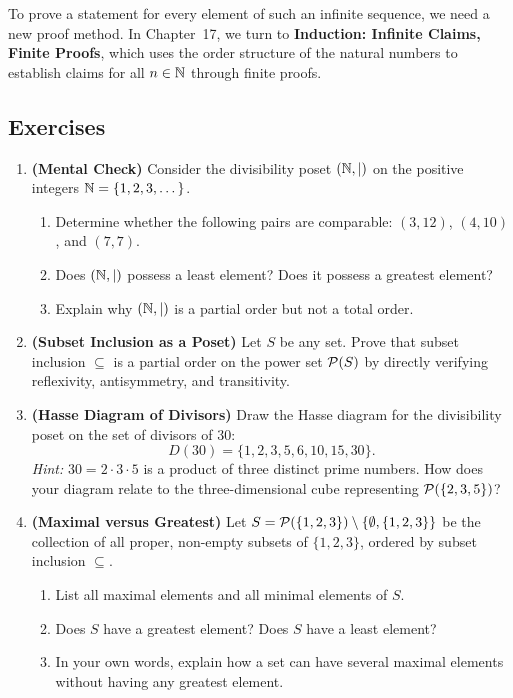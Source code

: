 To prove a statement for every element of such an infinite sequence, we need a new proof method. In Chapter~17, we turn to \textbf{Induction: Infinite Claims, Finite Proofs}, which uses the order structure of the natural numbers to establish claims for all $n \in \mathbb{N}$ through finite proofs.

\subsection{Exercises}

\begin{enumerate}
\item \textbf{(Mental Check)} Consider the divisibility poset $(\mathbb{N}, \mid)$ on the positive integers $\mathbb{N} = \{1, 2, 3, \dots\}$.
\begin{enumerate}[label=(\alph*)]
\item Determine whether the following pairs are comparable: $(3, 12)$, $(4, 10)$, and $(7, 7)$.
\item Does $(\mathbb{N}, \mid)$ possess a least element? Does it possess a greatest element?
\item Explain why $(\mathbb{N}, \mid)$ is a partial order but not a total order.
\end{enumerate}

\item \textbf{(Subset Inclusion as a Poset)} Let $S$ be any set. Prove that subset inclusion $\subseteq$ is a partial order on the power set $\mathcal{P}(S)$ by directly verifying reflexivity, antisymmetry, and transitivity.

\item \textbf{(Hasse Diagram of Divisors)} Draw the Hasse diagram for the divisibility poset on the set of divisors of $30$:
\[
D(30) = \{1, 2, 3, 5, 6, 10, 15, 30\}.
\]
\emph{Hint:} $30 = 2 \cdot 3 \cdot 5$ is a product of three distinct prime numbers. How does your diagram relate to the three-dimensional cube representing $\mathcal{P}(\{2, 3, 5\})$?

\item \textbf{(Maximal versus Greatest)} Let $S = \mathcal{P}(\{1, 2, 3\}) \setminus \{\emptyset, \{1, 2, 3\}\}$ be the collection of all proper, non-empty subsets of $\{1, 2, 3\}$, ordered by subset inclusion $\subseteq$.
\begin{enumerate}[label=(\alph*)]
\item List all maximal elements and all minimal elements of $S$.
\item Does $S$ have a greatest element? Does $S$ have a least element?
\item In your own words, explain how a set can have several maximal elements without having any greatest element.
\end{enumerate}


\end{enumerate}
